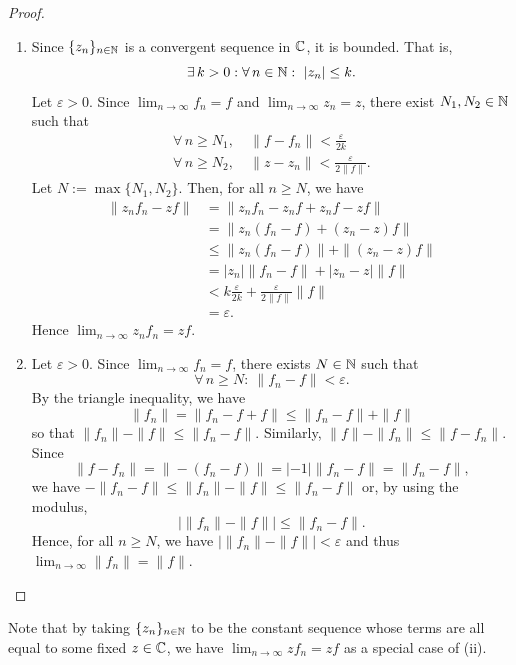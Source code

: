 \begin{proof}
\begin{enumerate}[label=(\roman*)]
\item Since $\{z_n\}_{n\in \mathbb{N}}$ is a convergent sequence in $\mathbb{C}$, it is bounded. That is,
\begin{equation*}
\exists \, k>0 : \forall \, n\in \mathbb{N} : \ |z_n|\leq k.
\end{equation*}
Let $\varepsilon >0$. Since $\displaystyle \lim_{n\to \infty}f_n=f$ and $\displaystyle \lim_{n\to \infty}z_n=z$, there exist $N_1,N_2\in \mathbb{N}$ such that
\begin{align*}
  \forall \, n\geq N_1, & \ \|f-f_n\|<\frac{\varepsilon}{2k}\\
  \forall \, n\geq N_2, & \ \|z-z_n\|<\frac{\varepsilon}{2\|f\|}.
\end{align*}
Let $N:=\max\{N_1,N_2\}$. Then, for all $n\geq N$, we have
\begin{align*}
\|z_nf_n-zf\|
&= \|z_nf_n-z_nf+z_nf-zf\|\\
&= \|z_n(f_n-f)+(z_n-z)f\|\\
&\leq \|z_n(f_n-f)\|+\|(z_n-z)f\|\\
&= |z_n|\|f_n-f\|+|z_n-z|\|f\|\\
& < k\frac{\varepsilon}{2k}+\frac{\varepsilon}{2\|f\|}\|f\|\\
& = \varepsilon.
\end{align*}
Hence $\displaystyle \lim_{n\to \infty}z_nf_n=zf$.
\item Let $\varepsilon >0$. Since  $\displaystyle \lim_{n\to \infty}f_n=f$, there exists $N\in \mathbb{N}$ such that
\begin{equation*}
\forall \, n \geq N : \ \|f_n-f\|<\varepsilon.
\end{equation*}
By the triangle inequality, we have
\begin{equation*}
\|f_n\| = \|f_n-f+f\| \leq \|f_n-f\|+\|f\|  
\end{equation*}
so that $\|f_n\|-\|f\|\leq \|f_n-f\|$. Similarly, $\|f\|-\|f_n\|\leq \|f-f_n\|$. Since
\begin{equation*}
\|f-f_n\| = \|-(f_n-f)\| = |-1|\|f_n-f\| = \|f_n-f\|,
\end{equation*}
we have $-\|f_n-f\|\leq\|f_n\|-\|f\|\leq\|f_n-f\|$ or, by using the modulus,
\begin{equation*}
\bigl| \|f_n\|-\|f\|\bigr| \leq \|f_n-f\|.
\end{equation*}
Hence, for all $n\geq N$, we have $\bigl| \|f_n\|-\|f\|\bigr| <\varepsilon$ and thus  $\displaystyle \lim_{n\to \infty}\|f_n\|=\|f\|$.
\qedhere
\end{enumerate}
\end{proof}
\fi
Note that by taking $\{z_n\}_{n\in\mathbb{N}}$ to be the constant sequence whose terms are all equal to some fixed $z\in \mathbb{C}$, we have $\displaystyle \lim_{n\to \infty}zf_n=zf$ as a special case of (ii).

